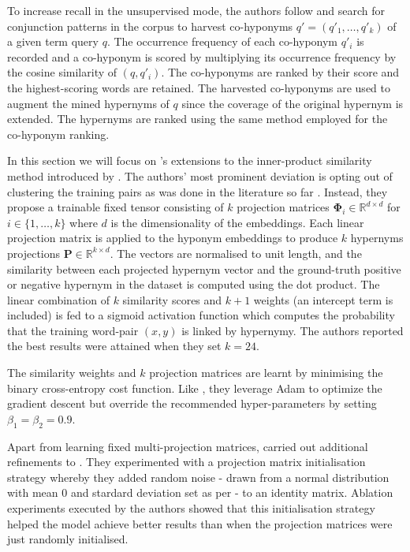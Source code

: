 To increase recall in the unsupervised mode, the authors follow \citep{Snow2004, ritter2009anyway} and search for conjunction patterns in the corpus to harvest co-hyponyms $q'=(q'_1,\ldots,q'_k )$ of a given term query $q$.  The occurrence frequency of each co-hyponym $q'_i$ is recorded and a co-hyponym is scored by multiplying its occurrence frequency by the cosine similarity of $(q, q'_i)$.  The co-hyponyms are ranked by their score and the highest-scoring words are retained.  The harvested co-hyponyms are used to augment the mined hypernyms of $q$ since the coverage of the original hypernym is extended.  The hypernyms are ranked using the same method employed for the co-hyponym ranking.

In this section we will focus on \citeauthor{bernier2018crim}'s extensions to the inner-product similarity method introduced by \citep{yamane2016distributional}.  The authors’ most prominent deviation is opting out of clustering the training pairs as was done in the literature so far \citep{Fu2014, espinosa2016supervised, yamane2016distributional}.  Instead, they propose a trainable fixed tensor consisting of $k$ projection matrices $\bm{\Phi}_i \in \mathbb{R}^{d \times d}$ for $i \in \{1,\ldots,k\}$ where $d$ is the dimensionality of the embeddings.  Each linear projection matrix is applied to the hyponym embeddings to produce $k$ hypernyms projections $\bm{P} \in \mathbb{R}^{k \times d}$.  The vectors are normalised to unit length, and the similarity between each projected hypernym vector and the ground-truth positive or negative hypernym in the dataset is computed using the dot product.  The linear combination of $k$ similarity scores and $k+1$ weights (an intercept term is included) is fed to a sigmoid activation function which computes the probability that the training word-pair $(x,y)$ is linked by hypernymy.  The authors reported the best results were attained when they set $k=24$.  

The similarity weights and $k$ projection matrices are learnt by minimising the binary cross-entropy cost function.  Like \citep{yamane2016distributional}, they leverage Adam \citep{kingma2014adam} to optimize the gradient descent but override the recommended hyper-parameters by setting $\beta_1 = \beta_2 = 0.9$.

Apart from learning fixed multi-projection matrices, \citeauthor{bernier2018crim} carried out additional refinements to \citep{yamane2016distributional}.  They experimented with a projection matrix initialisation strategy whereby they added random noise - drawn from a normal distribution with mean 0 and stardard deviation set as per \citep{glorot2010understanding} - to an identity matrix.  Ablation experiments executed by the authors showed that this initialisation strategy helped the model achieve better results than when the projection matrices were just randomly initialised.

